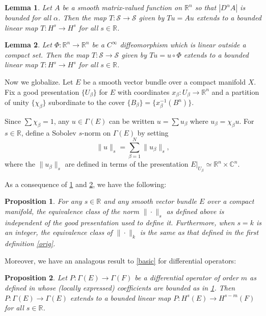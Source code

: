 \documentclass[14pt, reqno]{extarticle}
\theoremstyle{plain}
\newtheorem{proposition}{Proposition}[section]
\newtheorem{lemma}{Lemma}[section]
\theoremstyle{definition}
\theoremstyle{remark}
\newcommand{\RR}{\mathbb{R}}
\newcommand{\CC}{\mathbb{C}}
\begin{document}
\begin{lemma}\label{mtx}
    Let $A$ be a smooth matrix-valued function on $\RR^n$ so that $|D^\alpha A|$ is bounded for all $\alpha$. 
    Then the map $T: \mathscr{S} \to \mathscr{S}$ given by $Tu = Au$ extends to a bounded
    linear map $T: H^s \to H^s$ for all $s \in \RR$. 
\end{lemma}

\begin{lemma}\label{btx}
    Let $\Phi: \RR^n \to \RR^n$ be a $C^\infty$ diffeomorphism which is linear outside
    a compact set. Then the map $T: \mathscr{S} \to \mathscr{S}$ given by $Tu = u \circ \Phi$
    extends to a bounded linear map $T: H^s \to H^s$ for all $s \in \RR$. 
\end{lemma}

Now we globalize. Let $E$ be a smooth vector bundle over a compact manifold $X$. Fix a good presentation
$\{U_\beta\}$ for $E$ with coordinates $x_\beta: U_\beta \to \RR^n$ and a partition of 
unity $\{\chi_\beta\}$ subordinate to the cover $\{B_\beta\} = \{x^{-1}_\beta(B^n)\}$. 

Since $\sum \chi_\beta = 1$, any $u \in \Gamma(E)$ can be written $u = \sum u_\beta$ where
$u_\beta = \chi_\beta u$. For $s \in \RR$, define a Sobolev $s$-norm on $\Gamma(E)$ by
setting
\[
    \|u\|_s = \sum_{\beta = 1}^N \|u_\beta\|_s,
\]
where the $\|u_\beta\|_s$ are defined in terms of the presentation $E|_{U_\beta} \simeq \RR^n \times \CC^n$.

As a consequence of \ref{mtx} and \ref{btx}, we have the following: 

\begin{proposition}
    For any $s \in \RR$ and any smooth vector bundle $E$ over a compact manifold, the equivalence class
    of the norm $\|\cdot\|_s$ as defined above is independent of the good presentation used to define it.
    Furthermore, when $s = k$ is an integer, the equivalence class of $\|\cdot\|_k$ is the same
    as that defined in the first definition \ref{orig}.
\end{proposition}

Moreover, we have an analagous result to \ref{basic} for differential operators:

\begin{proposition}
    Let $P: \Gamma(E) \to \Gamma(F)$ be a differential operator of order $m$ as defined 
    in \label{diff}
    whose (locally expressed) coefficients are bounded as in \ref{mtx}. Then $P: \Gamma(E) \to \Gamma(E)$ 
    extends to a bounded linear map $P: H^s(E) \to H^{s-m}(F)$ for all $s \in \RR$. 
\end{proposition}
\end{document}
